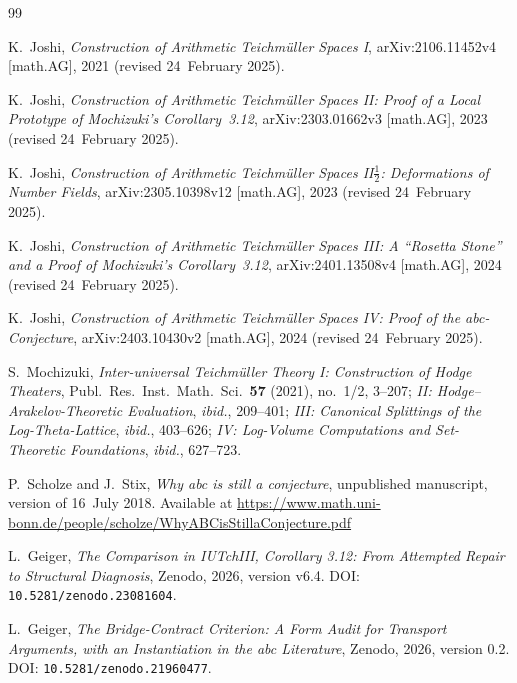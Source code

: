 \documentclass[11pt,a4paper]{article}
\begin{document}


\begin{thebibliography}{99}
\small
\raggedright
\sloppy
\setlength{\itemsep}{2pt plus 0.5pt minus 0.5pt}

K.~Joshi,
\emph{Construction of Arithmetic Teichmüller Spaces I},
arXiv:2106.11452v4 [math.AG], 2021 (revised 24~February 2025).

K.~Joshi,
\emph{Construction of Arithmetic Teichmüller Spaces II: Proof of a Local
Prototype of Mochizuki's Corollary~3.12},
arXiv:2303.01662v3 [math.AG], 2023 (revised 24~February 2025).

K.~Joshi,
\emph{Construction of Arithmetic Teichmüller Spaces II$\frac{1}{2}$:
Deformations of Number Fields},
arXiv:2305.10398v12 [math.AG], 2023 (revised 24~February 2025).

K.~Joshi,
\emph{Construction of Arithmetic Teichmüller Spaces III: A ``Rosetta Stone''
and a Proof of Mochizuki's Corollary~3.12},
arXiv:2401.13508v4 [math.AG], 2024 (revised 24~February 2025).

K.~Joshi,
\emph{Construction of Arithmetic Teichmüller Spaces IV: Proof of the
abc-Conjecture},
arXiv:2403.10430v2 [math.AG], 2024 (revised 24~February 2025).

S.~Mochizuki,
\emph{Inter-universal Teichmüller Theory I: Construction of Hodge
Theaters}, Publ.\ Res.\ Inst.\ Math.\ Sci.\ \textbf{57} (2021), no.~1/2,
3--207;
\emph{II: Hodge--Arakelov-Theoretic Evaluation}, \textit{ibid.}, 209--401;
\emph{III: Canonical Splittings of the Log-Theta-Lattice}, \textit{ibid.}, 403--626;
\emph{IV: Log-Volume Computations and Set-Theoretic Foundations},
\textit{ibid.}, 627--723.

P.~Scholze and J.~Stix,
\emph{Why abc is still a conjecture},
unpublished manuscript, version of 16~July 2018.
Available at
\url{https://www.math.uni-bonn.de/people/scholze/WhyABCisStillaConjecture.pdf}

L.~Geiger,
\emph{The Comparison in IUTchIII, Corollary 3.12: From Attempted Repair
to Structural Diagnosis},
Zenodo, 2026, version v6.4.
DOI: \nolinkurl{10.5281/zenodo.23081604}.

L.~Geiger,
\emph{The Bridge-Contract Criterion: A Form Audit for Transport Arguments,
with an Instantiation in the abc Literature},
Zenodo, 2026, version 0.2.
DOI: \nolinkurl{10.5281/zenodo.21960477}.


\end{thebibliography}
\end{document}

